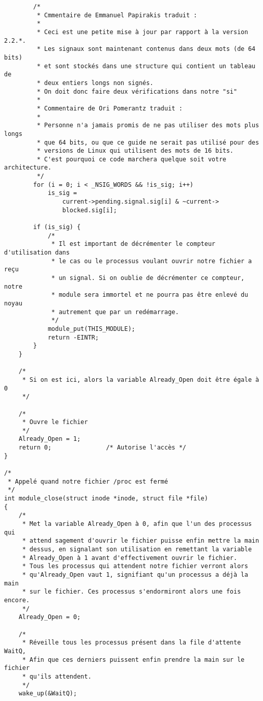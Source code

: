 \documentclass[11pt]{article}
\begin{document}
\begin{verbatim}
        /*
         * Cmmentaire de Emmanuel Papirakis traduit :
         *
         * Ceci est une petite mise à jour par rapport à la version 2.2.*.
         * Les signaux sont maintenant contenus dans deux mots (de 64 bits)
         * et sont stockés dans une structure qui contient un tableau de
         * deux entiers longs non signés.
         * On doit donc faire deux vérifications dans notre "si"
         *
         * Commentaire de Ori Pomerantz traduit :
         *
         * Personne n'a jamais promis de ne pas utiliser des mots plus longs
         * que 64 bits, ou que ce guide ne serait pas utilisé pour des
         * versions de Linux qui utilisent des mots de 16 bits.
         * C'est pourquoi ce code marchera quelque soit votre architecture.
         */
        for (i = 0; i < _NSIG_WORDS && !is_sig; i++)
            is_sig =
                current->pending.signal.sig[i] & ~current->
                blocked.sig[i];

        if (is_sig) {
            /*
             * Il est important de décrémenter le compteur d'utilisation dans
             * le cas ou le processus voulant ouvrir notre fichier a reçu
             * un signal. Si on oublie de décrémenter ce compteur, notre
             * module sera immortel et ne pourra pas être enlevé du noyau
             * autrement que par un redémarrage.
             */
            module_put(THIS_MODULE);
            return -EINTR;
        }
    }

    /*
     * Si on est ici, alors la variable Already_Open doit être égale à 0
     */

    /*
     * Ouvre le fichier
     */
    Already_Open = 1;
    return 0;               /* Autorise l'accès */
}

/*
 * Appelé quand notre fichier /proc est fermé
 */
int module_close(struct inode *inode, struct file *file)
{
    /*
     * Met la variable Already_Open à 0, afin que l'un des processus qui
     * attend sagement d'ouvrir le fichier puisse enfin mettre la main
     * dessus, en signalant son utilisation en remettant la variable
     * Already_Open à 1 avant d'effectivement ouvrir le fichier.
     * Tous les processus qui attendent notre fichier verront alors
     * qu'Already_Open vaut 1, signifiant qu'un processus a déjà la main
     * sur le fichier. Ces processus s'endormiront alors une fois encore.
     */
    Already_Open = 0;

    /*
     * Réveille tous les processus présent dans la file d'attente WaitQ,
     * Afin que ces derniers puissent enfin prendre la main sur le fichier
     * qu'ils attendent.
     */
    wake_up(&WaitQ);


\end{verbatim}
\end{document}
